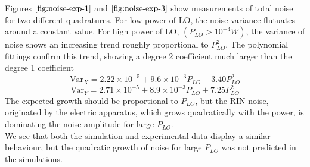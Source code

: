 %
Figures $\ref{fig:noise-exp-1}$ and $\ref{fig:noise-exp-3}$ show measurements of total noise for two different quadratures. For low power of LO, the noise variance flutuates around a constant value. For high power of LO, $(P_{LO}>10^{-4}W)$, the variance of noise shows an increasing trend roughly proportional to $P_{LO}^2$. The polynomial fittings confirm this trend, showing a degree 2 coefficient much larger than the degree 1 coefficient
%
\begin{equation}
\textrm{Var}_X = 2.22 \!\! \times \!\! 10^{-5} + 9.6 \!\! \times \!\! 10^{-3} P_{LO} + 3.40 P_{LO}^2
\end{equation}
\begin{equation}
\textrm{Var}_Y = 2.71 \!\! \times \!\! 10^{-5} + 8.9 \!\! \times \!\! 10^{-3} P_{LO} + 7.25 P_{LO}^2
\end{equation}
%
The expected growth should be proportional to $P_{LO}$, but the RIN noise, originated by the electric apparatus, which grows quadratically with the power, is dominating the noise amplitude for large $P_{LO}$.\\
We see that both the simulation and experimental data display a similar behaviour, but the quadratic growth of noise for large $P_{LO}$ was not predicted in the simulations.\\
